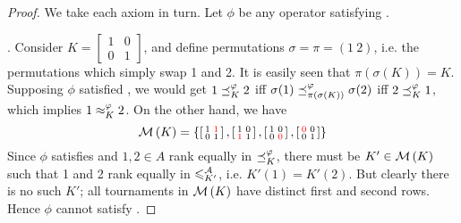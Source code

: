 \begin{proof}

    We take each axiom in turn. Let $\phi$ be any operator satisfying
    \chainmin{}.

    \anon{}. Consider $K = \left[\begin{smallmatrix} 1&0\\0&1
    \end{smallmatrix}\right]$, and define permutations $\sigma = \pi = (1\ 2)$,
    i.e. the permutations which simply swap 1 and 2. It is easily seen that
    $\pi(\sigma(K)) = K$. Supposing $\phi$ satisfied \anon{}, we would
    get $1 \preceq_K^\varphi 2$ iff $\sigma(1) \preceq_{\pi(\sigma(K))}^\varphi \sigma(2)$
    iff $2 \preceq_K^\varphi 1$, which implies $1 \approx_K^\varphi 2$.
    On the other hand, we have
    \[
        \operatorname{\mathcal{M}}\left({K}\right) = \left\{
           \left[\begin{smallmatrix}
               1 & \color{red}{1} \\
               0 & 1
           \end{smallmatrix}\right],
           \left[\begin{smallmatrix}
               1 & 0 \\
               \color{red}{1} & 1
           \end{smallmatrix}\right],
           \left[\begin{smallmatrix}
               1 & 0 \\
               0 & \color{red}{0}
           \end{smallmatrix}\right],
           \left[\begin{smallmatrix}
               \color{red}{0} & 0 \\
               0 & 1
           \end{smallmatrix}\right]
        \right\}
    \]
    Since $\phi$ satisfies \chainmin{} and $1, 2 \in A$ rank equally
    in ${\preceq_K^\varphi}$, there must be $K' \in \operatorname{\mathcal{M}}\left({K}\right)$ such that 1 and 2 rank
    equally in ${\leqslant^{\mathcal{A}}_{K'}}$, i.e. $K'(1) = K'(2)$. But clearly there is no
    such $K'$; all tournaments in $\operatorname{\mathcal{M}}\left({K}\right)$ have distinct first and second
    rows. Hence $\phi$ cannot satisfy \anon{}.


\end{proof}
